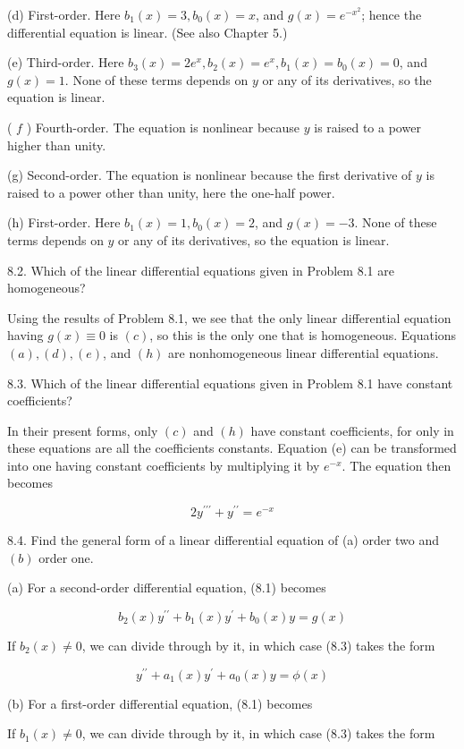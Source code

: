\documentclass[10pt]{article}
\begin{document}
(d) First-order. Here $b_{1}(x)=3, b_{0}(x)=x$, and $g(x)=e^{-x^{2}}$; hence the differential equation is linear. (See also Chapter 5.)

(e) Third-order. Here $b_{3}(x)=2 e^{x}, b_{2}(x)=e^{x}, b_{1}(x)=b_{0}(x)=0$, and $g(x)=1$. None of these terms depends on $y$ or any of its derivatives, so the equation is linear.

( $f$ ) Fourth-order. The equation is nonlinear because $y$ is raised to a power higher than unity.

(g) Second-order. The equation is nonlinear because the first derivative of $y$ is raised to a power other than unity, here the one-half power.

(h) First-order. Here $b_{1}(x)=1, b_{0}(x)=2$, and $g(x)=-3$. None of these terms depends on $y$ or any of its derivatives, so the equation is linear.

8.2. Which of the linear differential equations given in Problem 8.1 are homogeneous?

Using the results of Problem 8.1, we see that the only linear differential equation having $g(x) \equiv 0$ is $(c)$, so this is the only one that is homogeneous. Equations $(a),(d),(e)$, and $(h)$ are nonhomogeneous linear differential equations.

8.3. Which of the linear differential equations given in Problem 8.1 have constant coefficients?

In their present forms, only $(c)$ and $(h)$ have constant coefficients, for only in these equations are all the coefficients constants. Equation (e) can be transformed into one having constant coefficients by multiplying it by $e^{-x}$. The equation then becomes

$$
2 y^{\prime \prime \prime}+y^{\prime \prime}=e^{-x}
$$

8.4. Find the general form of a linear differential equation of (a) order two and $(b)$ order one.

(a) For a second-order differential equation, (8.1) becomes

$$
b_{2}(x) y^{\prime \prime}+b_{1}(x) y^{\prime}+b_{0}(x) y=g(x)
$$

If $b_{2}(x) \neq 0$, we can divide through by it, in which case (8.3) takes the form

$$
y^{\prime \prime}+a_{1}(x) y^{\prime}+a_{0}(x) y=\phi(x)
$$

(b) For a first-order differential equation, (8.1) becomes

If $b_{1}(x) \neq 0$, we can divide through by it, in which case (8.3) takes the form
\end{document}
